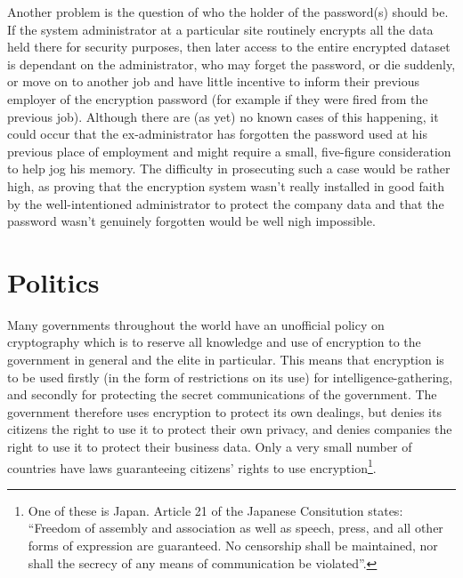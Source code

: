 Another problem is the question of who the holder of the password(s) should be.
If the system administrator at a particular site routinely encrypts all the
data held there for security purposes, then later access to the entire
encrypted dataset is dependant on the administrator, who may forget the
password, or die suddenly, or move on to another job and have little incentive
to inform their previous employer of the encryption password (for example if
they were fired from the previous job).  Although there are (as yet) no known
cases of this happening, it could occur that the ex-administrator has forgotten
the password used at his previous place of employment and might require a
small, five-figure consideration to help jog his memory.  The difficulty in
prosecuting such a case would be rather high, as proving that the encryption
system wasn't really installed in good faith by the well-intentioned
administrator to protect the company data and that the password wasn't
genuinely forgotten would be well nigh impossible.


\section{Politics}

Many governments throughout the world have an unofficial policy on cryptography
which is to reserve all knowledge and use of encryption to the government in
general and the elite in particular.  This means that encryption is to be used
firstly (in the form of restrictions on its use) for intelligence-gathering,
and secondly for protecting the secret communications of the government.
The government therefore uses encryption to protect its own dealings, but
denies its citizens the right to use it to protect their own privacy, and
denies companies the right to use it to protect their business data.  Only a
very small number of countries have laws guaranteeing citizens' rights to use
encryption\footnote{
		One of these is Japan.  Article 21 of the Japanese Consitution
              	states:  ``Freedom of assembly and association as well as speech,
              	press, and all other forms of expression are guaranteed.  No
              	censorship shall be maintained, nor shall the secrecy of any
              	means of communication be violated''.}.

